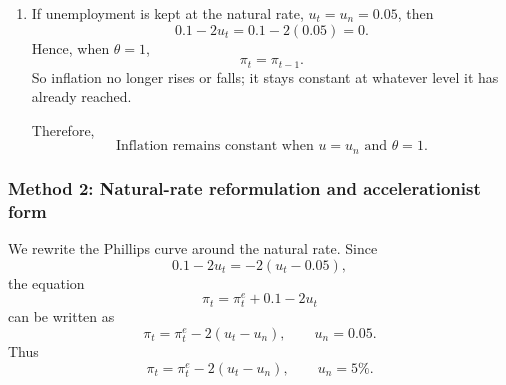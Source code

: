 \documentclass[12pt]{article}
\begin{document}
\begin{enumerate}[label=(\alph*)]
    So when \(\theta=1\) and unemployment is kept below the natural rate, inflation accelerates:
    \[
    \boxed{\text{Inflation keeps increasing over time.}}
    \]

    \item
    If unemployment is kept at the natural rate, \(u_t=u_n=0.05\), then
    \[
    0.1-2u_t=0.1-2(0.05)=0.
    \]
    Hence, when \(\theta=1\),
    \[
    \pi_t=\pi_{t-1}.
    \]
    So inflation no longer rises or falls; it stays constant at whatever level it has already reached.

    Therefore,
    \[
    \boxed{\text{Inflation remains constant when }u=u_n\text{ and }\theta=1.}
    \]
\end{enumerate}

\newpage
\subsubsection{Method 2: Natural-rate reformulation and accelerationist form}
We rewrite the Phillips curve around the natural rate. Since
\[
0.1-2u_t=-2(u_t-0.05),
\]
the equation
\[
\pi_t=\pi_t^e+0.1-2u_t
\]
can be written as
\[
\pi_t=\pi_t^e-2(u_t-u_n),
\qquad
u_n=0.05.
\]
Thus
\[
\boxed{\pi_t=\pi_t^e-2(u_t-u_n),\qquad u_n=5\%.}
\]
\end{document}
